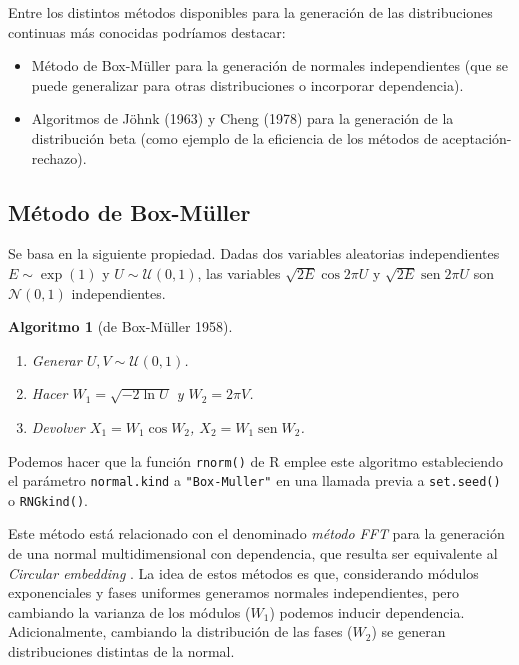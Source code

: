 \documentclass[
  spanish,
  10pt,
]{book}
\theoremstyle{break}
\newtheorem{conjecture}{Algoritmo}[chapter]
\theoremstyle{nonumberplain}
\begin{document}
Entre los distintos métodos disponibles para la generación de las distribuciones continuas más conocidas podríamos destacar:

\begin{itemize}
\item
  Método de Box-Müller para la generación de normales independientes (que se puede generalizar para otras distribuciones o incorporar dependencia).
\item
  Algoritmos de Jöhnk (1963) y Cheng (1978) para la generación de la distribución beta (como ejemplo de la eficiencia de los métodos de aceptación-rechazo).
\end{itemize}

\subsection{Método de Box-Müller}\label{muxe9todo-de-box-muxfcller}

Se basa en la siguiente propiedad. Dadas dos variables aleatorias independientes \(E \sim \exp\left(  1\right)\) y
\(U \sim \mathcal{U}( 0, 1 )\), las variables
\(\sqrt{2E} \cos 2\pi U\) y \(\sqrt{2E}\operatorname{sen} 2\pi U\) son
\(\mathcal{N}( 0, 1 )\) independientes.

\begin{conjecture}[de Box-Müller 1958]
\protect\hypertarget{cnj:box-muller}{}\label{cnj:box-muller}

\begin{enumerate}
\def\labelenumi{\arabic{enumi}.}
\item
  Generar \(U,V\sim \mathcal{U}(0, 1)\).
\item
  Hacer \(W_1=\sqrt{-2\ln U}\) y \(W_2=2\pi V\).
\item
  Devolver \(X_1=W_1\cos W_2\), \(X_2=W_1\operatorname{sen}W_2\).
\end{enumerate}

\end{conjecture}

Podemos hacer que la función \texttt{rnorm()} de R emplee este algoritmo estableciendo el parámetro \texttt{normal.kind} a \texttt{"Box-Muller"} en una llamada previa a \texttt{set.seed()} o \texttt{RNGkind()}.

Este método está relacionado con el denominado \emph{método FFT} \citep[transformada rápida de Fourier, e.g.][]{davies1987} para la generación de una normal multidimensional con dependencia, que resulta ser equivalente al \emph{Circular embedding} \citep{dietrich1997}.
La idea de estos métodos es que, considerando módulos exponenciales y fases uniformes generamos normales independientes, pero cambiando la varianza de los módulos (\(W_1\)) podemos inducir dependencia.
Adicionalmente, cambiando la distribución de las fases (\(W_2\)) se generan distribuciones distintas de la normal.
\end{document}
